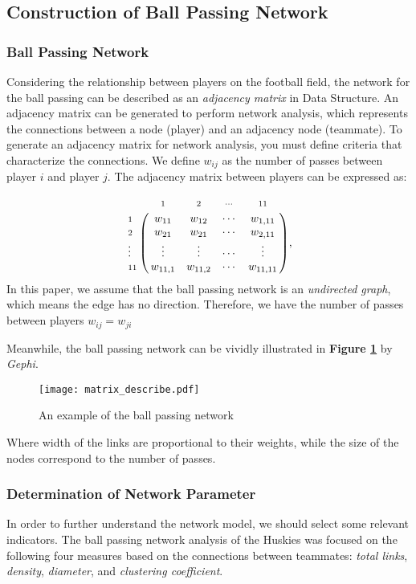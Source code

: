 \documentclass[12pt]{article}  %
\newcommand{\upcite}[1]{\textsuperscript{\textsuperscript{\cite{#1}}}}
\begin{document}
\subsection{Construction of Ball Passing Network}
\subsubsection{Ball Passing Network}
Considering the relationship between players on the football field, the network for the ball passing can be described as an \textit{adjacency matrix}\upcite{1} in Data Structure. An adjacency matrix can be generated to perform network analysis, which represents the connections between a node (player) and an adjacency node (teammate). To generate an adjacency matrix for network analysis, you must define criteria that characterize the connections. We define $w_{ij}$ as the number of passes between player $i$ and player $j$. The adjacency matrix between players can be expressed as:

\begin{equation}\label{Eq:matrix1}
    \bordermatrix{%
           & \scriptstyle 1       & \scriptstyle 2     &\scriptstyle \cdots     &\scriptstyle 11\cr
    \scriptstyle 1    & w_{11}         & w_{12}       &\cdots     & w_{1,11}\cr
    \scriptstyle 2    & w_{21}         & w_{21}       &\cdots     & w_{2,11}\cr
    \scriptstyle\vdots & \vdots    &\vdots   &\cdots     &\vdots\cr
    \scriptstyle 11    & w_{11,1}         & w_{11,2}       &\cdots     &w_{11,11}
    },
    \end{equation}
In this paper, we assume that the ball passing network is an \textit{undirected graph}, which means the edge has no direction. Therefore, we have the number of passes between players $w_{ij}=w_{ji}$

Meanwhile, the ball passing network can be vividly illustrated in \textbf{Figure \ref{fig:exam_network}} by \textit{Gephi}.
\begin{figure}[htbp]
    \centering
    \texttt{[image: matrix\_describe.pdf]} 	%
    \caption{An example of the ball passing network}		%
    \label{fig:exam_network}							%
\end{figure}

Where width of the links are proportional to their weights, while the size of the nodes correspond to the number of passes.


\subsubsection{Determination of Network Parameter}
In order to further understand the network model, we should select some relevant indicators. The ball passing network analysis of the Huskies was focused on the following four measures based on the connections between teammates: \textit{total links}, \textit{density}, \textit{diameter}, and \textit{clustering coefficient}.
\end{document}
